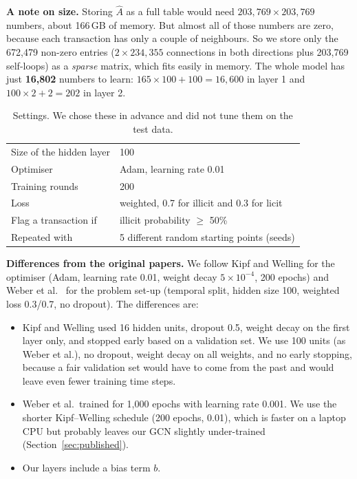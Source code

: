 \documentclass[11pt,a4paper]{article}
\newcommand{\Ahat}{\hat{A}}
\begin{document}
\textbf{A note on size.} Storing $\Ahat$ as a full table would need $203{,}769 \times 203{,}769$ numbers, about 166\,GB of
memory. But almost all of those numbers are zero, because each transaction has only a couple of neighbours. So we store
only the 672,479 non-zero entries ($2 \times 234{,}355$ connections in both directions plus 203,769 self-loops) as a
\emph{sparse} matrix, which fits easily in memory. The whole model has just \textbf{16,802} numbers to learn:
$165\times100 + 100 = 16{,}600$ in layer 1 and $100\times2 + 2 = 202$ in layer 2.

\begin{table}[H]
\centering\small
\begin{tabular}{ll}
\toprule
Size of the hidden layer & 100 \\
Optimiser & Adam, learning rate 0.01 \\
Training rounds & 200 \\
Loss & weighted, 0.7 for illicit and 0.3 for licit \\
Flag a transaction if & illicit probability $\ge$ 50\% \\
Repeated with & 5 different random starting points (seeds) \\
\bottomrule
\end{tabular}
\caption{Settings. We chose these in advance and did not tune them on the test data.}
\end{table}

\textbf{Differences from the original papers.} We follow Kipf and Welling \cite{kipf} for the optimiser (Adam, learning rate
0.01, weight decay $5\times10^{-4}$, 200 epochs) and Weber et al.\ \cite{weber} for the problem set-up (temporal split,
hidden size 100, weighted loss 0.3/0.7, no dropout). The differences are:
\begin{itemize}
  \item Kipf and Welling used 16 hidden units, dropout 0.5, weight decay on the first layer only, and stopped early based on a
        validation set. We use 100 units (as Weber et al.), no dropout, weight decay on all weights, and no early stopping,
        because a fair validation set would have to come from the past and would leave even fewer training time steps.
  \item Weber et al.\ trained for 1,000 epochs with learning rate 0.001. We use the shorter Kipf--Welling schedule
        (200 epochs, 0.01), which is faster on a laptop CPU but probably leaves our GCN slightly under-trained
        (Section~\ref{sec:published}).
  \item Our layers include a bias term $b$.
\end{itemize}
\end{document}
